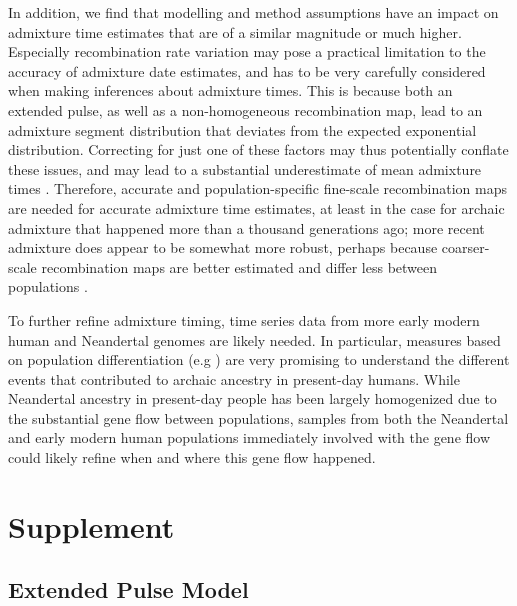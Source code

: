 \documentclass[]{article}
\begin{document}
In addition, we find that modelling and method assumptions have an impact on admixture time estimates that are of a similar magnitude or much higher. Especially recombination rate variation may pose a practical limitation to the accuracy of admixture date estimates, and has to be very carefully considered when making inferences about admixture times. This is because both an extended pulse, as well as a non-homogeneous recombination map, lead to an admixture segment distribution that deviates from the expected exponential distribution. Correcting for just one of these factors may thus potentially conflate these issues, and may lead to a substantial underestimate of mean admixture times \citep{sankararaman_date_2012}. Therefore, accurate and population-specific fine-scale recombination maps are needed for accurate admixture time estimates, at least in the case for archaic admixture that happened more than a thousand generations ago; more recent admixture does appear to be somewhat more robust, perhaps because coarser-scale recombination maps are better estimated and differ less between populations \citep{hinch_landscape_2011}. 


To further refine admixture timing, time series data from more early modern human and Neandertal genomes are likely needed. In particular, measures based on population differentiation (e.g \citep{browning_analysis_2018,wall_higher_2013,villanea_multiple_2019}) are very promising to understand the different events that contributed to archaic ancestry in present-day humans. While Neandertal ancestry in present-day people has been largely homogenized due to the substantial gene flow between populations, samples from both the Neandertal and early modern human populations immediately involved with the gene flow could likely refine when and where this gene flow happened. 







\hypertarget{refs}{}




\pagebreak
\setcounter{figure}{0} \renewcommand{\figurename}{Fig. S}
\renewcommand{\tablename}{Tab. S}

\section{Supplement}\label{supplement}

\subsection{Extended Pulse Model}
\end{document}
